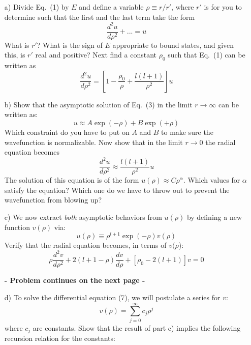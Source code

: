 \documentclass[11pt]{article}
\begin{document}
\begin{itemize}
\item[a)]
Divide Eq.\ (1) by $E$ and define a variable $\rho \equiv r/r'$, where $r'$ is for you to determine such that the
first and the last term take the form
\begin{equation}
\frac{d^2u}{d\rho^2} + ... = u
\end{equation}
What is $r'$? What is the sign of $E$ appropriate to bound states, and given this, is $r'$ real and positive?
Next find a constant $\rho_0$ such that Eq.\ (1) can be written as
\begin{equation}
\frac{d^2u}{d\rho^2} = \left[1 - \frac{\rho_0}{\rho} + \frac{l(l+1)}{\rho^2} \right]u
\end{equation}
\item[b)]
Show that the asymptotic solution of Eq.\ (3) in the limit $r\rightarrow\infty$ can be written as:
\begin{equation}
u \approx A \exp(-\rho) + B \exp(+\rho)
\end{equation}
Which constraint do you have to put on $A$ and $B$ to make sure the wavefunction is normalizable.
Now show that in the limit $r\rightarrow 0$ the radial equation becomes
\begin{equation}
\frac{d^2u}{d\rho^2} \approx \frac{l(l+1)}{\rho^2} u
\end{equation}
The solution of this equation is of the form $u(\rho) \approx C\rho^\alpha$. Which values for $\alpha$ satisfy the equation?
Which one do we have to throw out to prevent the wavefunction from blowing up?
\item[c)]
We now extract {\it both} asymptotic behaviors from $u(\rho)$ by defining a new function $v(\rho)$ via:
\begin{equation}
u(\rho) \equiv \rho^{l+1} \exp(-\rho) v(\rho)
\end{equation}
Verify that the radial equation becomes, in terms of $v(\rho$):
\begin{equation}
\rho \frac{d^2v}{d\rho^2} + 2(l+1-\rho) \frac{dv}{d\rho} + [\rho_0-2(l+1)]v = 0
\end{equation}
\centerline{\bf - Problem continues on the next page -}
\item[d)]
To solve the differential equation (7), we will postulate a series for $v$:
\begin{equation}
v(\rho) = \sum\limits_{j=0}^{\infty} c_j\rho^j
\end{equation}
where $c_j$ are constants. Show that the result of part c) implies the following recursion relation for the constants:

\end{itemize}
\end{document}
